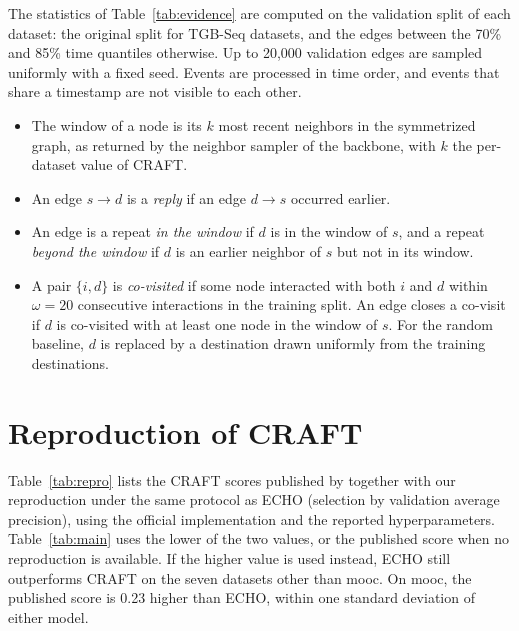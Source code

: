 \documentclass[twoside]{article}
\newcommand{\ours}{ECHO}
\begin{document}
The statistics of Table~\ref{tab:evidence} are computed on the validation split of each dataset: the original split for TGB-Seq datasets, and the edges between the 70\% and 85\% time quantiles otherwise. Up to 20,000 validation edges are sampled uniformly with a fixed seed. Events are processed in time order, and events that share a timestamp are not visible to each other.
\begin{itemize}
\item The window of a node is its $k$ most recent neighbors in the symmetrized graph, as returned by the neighbor sampler of the backbone, with $k$ the per-dataset value of CRAFT.
\item An edge $s\to d$ is a \emph{reply} if an edge $d\to s$ occurred earlier.
\item An edge is a repeat \emph{in the window} if $d$ is in the window of $s$, and a repeat \emph{beyond the window} if $d$ is an earlier neighbor of $s$ but not in its window.
\item A pair $\{i,d\}$ is \emph{co-visited} if some node interacted with both $i$ and $d$ within $\omega=20$ consecutive interactions in the training split. An edge closes a co-visit if $d$ is co-visited with at least one node in the window of $s$. For the random baseline, $d$ is replaced by a destination drawn uniformly from the training destinations.
\end{itemize}

\section{Reproduction of CRAFT}
\label{app:repro}

Table~\ref{tab:repro} lists the CRAFT scores published by \citet{yi2025craft} together with our reproduction under the same protocol as \ours{} (selection by validation average precision), using the official implementation and the reported hyperparameters. Table~\ref{tab:main} uses the lower of the two values, or the published score when no reproduction is available. If the higher value is used instead, \ours{} still outperforms CRAFT on the seven datasets other than mooc. On mooc, the published score is 0.23 higher than \ours{}, within one standard deviation of either model.
\end{document}
